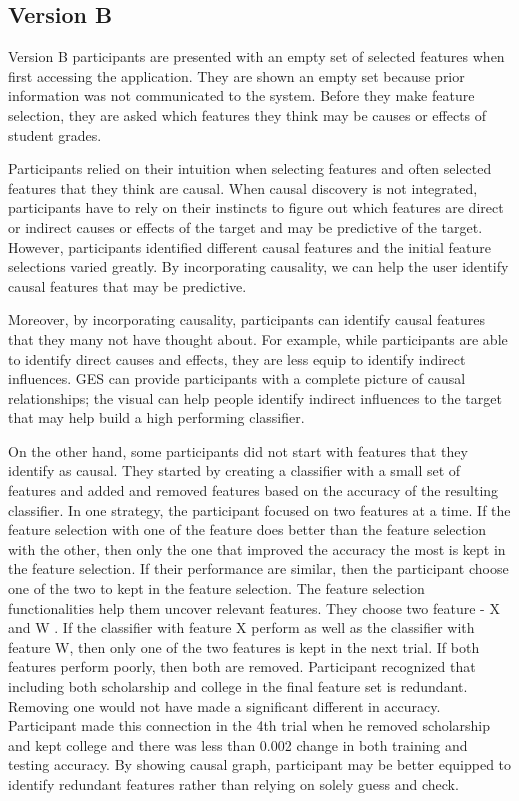 \subsection { Version B }
Version B participants are presented with an empty set of selected features when first accessing the application. They are shown an empty set because prior information was not communicated to the system. Before they make feature selection, they are asked which features they think may be causes or effects of student grades.

Participants relied on their intuition when selecting features and often selected features that they think are causal. When causal discovery is not integrated, participants have to rely on their instincts to figure out which features are direct or indirect causes or effects of the target and may be predictive of the target. However, participants identified different causal features and the initial feature selections varied greatly. By incorporating causality, we can help the user identify causal features that may be predictive.

Moreover, by incorporating causality, participants can identify causal features that they many not have thought about. For example, while participants are able to identify direct causes and effects, they are less equip to identify indirect influences. GES can provide participants with a complete picture of causal relationships; the visual can help people identify indirect influences to the target that may help build a high performing classifier.

On the other hand, some participants did not start with features that they identify as causal. They started by creating a classifier with a small set of features and added and removed features based on the accuracy of the resulting classifier. In one strategy, the participant focused on two features at a time. If the feature selection with one of the feature does better than the feature selection with the other, then only the one that improved the accuracy the most is kept in the feature selection. If their performance are similar, then the participant choose one of the two to kept in the feature selection.
The feature selection functionalities help them uncover relevant features. They choose two feature - X and W . If the classifier with feature X perform as well as the classifier with feature W, then only one of the two features is kept in the next trial. If both features perform poorly, then both are removed. Participant recognized that including both scholarship and college in the final feature set is redundant. Removing one would not have made a significant different in accuracy. Participant made this connection in the 4th trial when he removed scholarship and kept college and there was less than 0.002 change in both training and testing accuracy. By showing causal graph, participant may be better equipped to identify redundant features rather than relying on solely guess and check.


